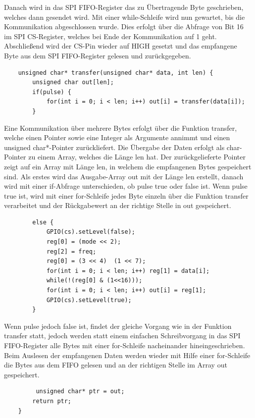 \documentclass[12pt]{article}
\begin{document}
Danach wird in das SPI FIFO-Register das zu Übertragende Byte geschrieben, welches dann gesendet wird. Mit einer while-Schleife wird nun gewartet, bis die Kommunikation abgeschlossen wurde. Dies erfolgt über die Abfrage von Bit 16 im SPI CS-Register, welches bei Ende der Kommunikation auf 1 geht. Abschließend wird der CS-Pin wieder auf HIGH gesetzt und das empfangene Byte aus dem SPI FIFO-Register gelesen und zurückgegeben.\\
\begin{verbatim}
    unsigned char* transfer(unsigned char* data, int len) {
        unsigned char out[len];
        if(pulse) {
            for(int i = 0; i < len; i++) out[i] = transfer(data[i]);
        } 
\end{verbatim}
Eine Kommunikation über mehrere Bytes erfolgt über die Funktion transfer, welche einen Pointer sowie eine Integer als Argumente annimmt und einen unsigned char*-Pointer zurückliefert. Die Übergabe der Daten erfolgt als char-Pointer zu einem Array, welches die Länge len hat. Der zurückgelieferte Pointer zeigt auf ein Array mit Länge len, in welchem die empfangenen Bytes gespeichert sind. Als erstes wird das Ausgabe-Array out mit der Länge len erstellt, danach wird mit einer if-Abfrage unterschieden, ob pulse true oder false ist. Wenn pulse true ist, wird mit einer for-Schleife jedes Byte einzeln über die Funktion transfer verarbeitet und der Rückgabewert an der richtige Stelle in out gespeichert.\\
\begin{verbatim}
        else {
            GPIO(cs).setLevel(false);
            reg[0] = (mode << 2);
            reg[2] = freq;
            reg[0] = (3 << 4)  (1 << 7);
            for(int i = 0; i < len; i++) reg[1] = data[i];
            while(!(reg[0] & (1<<16)));
            for(int i = 0; i < len; i++) out[i] = reg[1];
            GPIO(cs).setLevel(true);
        } 
\end{verbatim}
Wenn pulse jedoch false ist, findet der gleiche Vorgang wie in der Funktion transfer statt, jedoch werden statt einem einfachen Schreibvorgang in das SPI FIFO-Register alle Bytes mit einer for-Schleife nacheinander hineingeschrieben. Beim Auslesen der empfangenen Daten werden wieder mit Hilfe einer for-Schleife die Bytes aus dem FIFO gelesen und an der richtigen Stelle im Array out gespeichert.\\
\begin{verbatim}
         unsigned char* ptr = out;
        return ptr;
    }
\end{verbatim}
\end{document}
